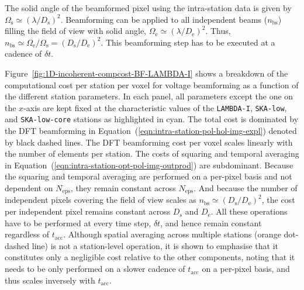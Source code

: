 \documentclass[
  journal=pasa,
  manuscript=article-type,
  year=2020,
  volume=37,
]{cup-journal}
\begin{document}
The solid angle of the beamformed pixel using the intra-station data is given by $\Omega_\textrm{s} \simeq (\lambda/D_\textrm{s})^2$. Beamforming can be applied to all independent beams ($n_\textrm{bs}$) filling the field of view with solid angle, $\Omega_\textrm{e} \simeq (\lambda/D_\textrm{e})^2$. Thus, $n_\textrm{bs} \simeq \Omega_\textrm{e}/\Omega_\textrm{s}=(D_\textrm{s}/D_\textrm{e})^2$. This beamforming step has to be executed at a cadence of $\delta t$. 

Figure~\ref{fig:1D-incoherent-compcost-BF-LAMBDA-I} shows a breakdown of the computational cost per station per voxel for voltage beamforming as a function of the different station parameters. In each panel, all parameters except the one on the $x$-axis are kept fixed at the characteristic values of the \texttt{LAMBDA-I}, \texttt{SKA-low}, and \texttt{SKA-low-core} stations as highlighted in cyan. The total cost is dominated by the DFT beamforming in Equation~(\ref{eqn:intra-station-pol-hol-img-expl}) denoted by black dashed lines. The DFT beamforming cost per voxel scales linearly with the number of elements per station. The costs of squaring and temporal averaging in Equation~(\ref{eqn:intra-station-opt-pol-img-outprod}) are subdominant. Because the squaring and temporal averaging are performed on a per-pixel basis and not dependent on $N_\textrm{eps}$, they remain constant across $N_\textrm{eps}$. And because the number of independent pixels covering the field of view scales as $n_\textrm{bs} \simeq (D_\textrm{s}/D_\textrm{e})^2$, the cost per independent pixel remains constant across $D_\textrm{s}$ and $D_\textrm{e}$. All these operations have to be performed at every time step, $\delta t$, and hence remain constant regardless of $t_\textrm{acc}$. Although spatial averaging across multiple stations (orange dot-dashed line) is not a station-level operation, it is shown to emphasise that it constitutes only a negligible cost relative to the other components, noting that it needs to be only performed on a slower cadence of $t_\textrm{acc}$ on a per-pixel basis, and thus scales inversely with $t_\textrm{acc}$.
\end{document}
